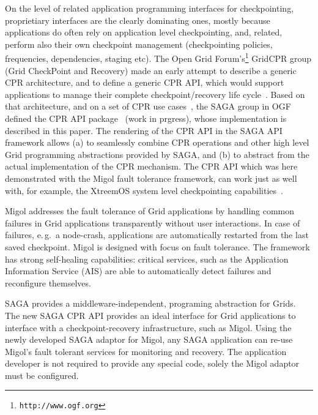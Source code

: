 \documentclass[times, 10pt,twocolumn]{article}
\begin{document}
On the level of related application programming interfaces for
checkpointing, proprietiary interfaces are the clearly dominating
ones, mostly because applications do often rely on application level
checkpointing, and, related, perform also their own checkpoint
management (checkpointing policies, frequencies, dependencies, staging
etc).  The Open Grid Forum's\footnote{\texttt{http://www.ogf.org}}
GridCPR group (Grid CheckPoint and Recovery) made an early attempt to
describe a generic CPR architecture, and to define a generic CPR API,
which would support applications to manage their complete
checkpoint/recovery life cycle~\cite{ogf_cpr_arch}.  Based on that
architecture, and on a set of CPR use cases~\cite{ogf_cpr_uc}, the
SAGA group in OGF defined the CPR API package~\cite{ogf_cpr_draft}
(work in prgress), whose implementation is described in this paper.
The rendering of the CPR API in the SAGA API framework allows (a) to
seamlessly combine CPR operations and other high level Grid
programming abstractions provided by SAGA, and (b) to abstract from
the actual implementation of the CPR mechanism.  The CPR API which was
here demonstrated with the Migol fault tolerance framework, can work
just as well with, for example, the XtreemOS system level
checkpointing capabilities~\cite{xtreemos_cpr}.

% 



Migol addresses the fault tolerance of Grid applications by handling common failures 
in Grid applications transparently without user interactions.  In case of failures, 
e.\,g.\ a node-crash, applications are automatically restarted 
from the last saved checkpoint.   
Migol is designed with focus on fault tolerance. 
The framework has strong self-healing capabilities: critical services, 
such as the Application Information Service (AIS) are
able to automatically detect failures and reconfigure themselves. 

SAGA provides a middleware-independent, programing abstraction for Grids. The new 
SAGA CPR API provides an ideal interface for Grid applications to interface with 
a checkpoint-recovery infrastructure, such as Migol. Using the newly developed SAGA adaptor for 
Migol, any SAGA application can re-use Migol's fault tolerant services for monitoring and recovery.
The application developer is not required to provide any special code, solely the Migol adaptor must be
configured.
\end{document}

